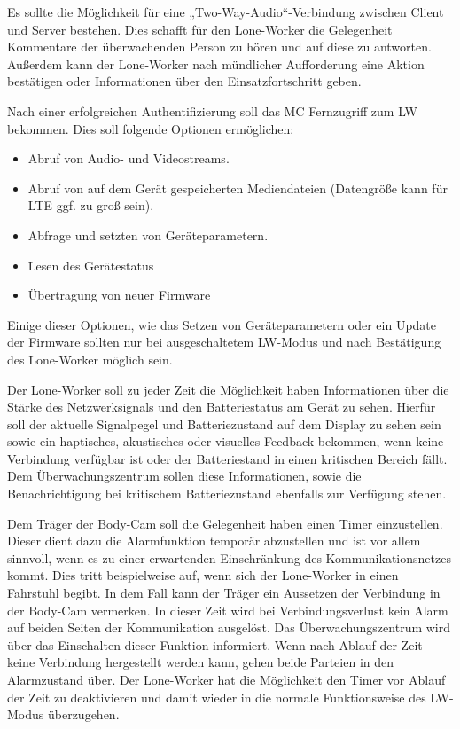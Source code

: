 \documentclass[thesis.tex]{subfiles}
\begin{document}
Es sollte die Möglichkeit für eine „Two-Way-Audio“-Verbindung zwischen Client und Server bestehen.
Dies schafft für den Lone-Worker die Gelegenheit Kommentare der überwachenden Person zu hören und auf diese zu antworten.
Außerdem kann der Lone-Worker nach mündlicher Aufforderung eine Aktion bestätigen oder Informationen über den Einsatzfortschritt geben.

Nach einer erfolgreichen Authentifizierung soll das MC Fernzugriff zum LW bekommen.
Dies soll folgende Optionen ermöglichen:
\begin{itemize}
    \item Abruf von Audio- und Videostreams.
    \item Abruf von auf dem Gerät gespeicherten Mediendateien (Datengröße kann für LTE ggf. zu groß sein).
    \item Abfrage und setzten von Geräteparametern.
    \item Lesen des Gerätestatus
    \item Übertragung von neuer Firmware
\end{itemize}

Einige dieser Optionen, wie das Setzen von Geräteparametern oder ein Update der Firmware sollten nur bei ausgeschaltetem LW-Modus und nach Bestätigung des Lone-Worker möglich sein.

Der Lone-Worker soll zu jeder Zeit die Möglichkeit haben Informationen über die Stärke des Netzwerksignals und den Batteriestatus am Gerät zu sehen. %
Hierfür soll der aktuelle Signalpegel und Batteriezustand auf dem Display zu sehen sein sowie ein haptisches, akustisches oder visuelles Feedback bekommen, wenn keine Verbindung verfügbar ist oder der Batteriestand in einen kritischen Bereich fällt.
Dem Überwachungszentrum sollen diese Informationen, sowie die Benachrichtigung bei kritischem Batteriezustand ebenfalls zur Verfügung stehen.

Dem Träger der Body-Cam soll die Gelegenheit haben einen \glqq Timer\grqq{} einzustellen.
Dieser dient dazu die Alarmfunktion temporär abzustellen und ist vor allem sinnvoll, wenn es zu einer erwartenden Einschränkung des Kommunikationsnetzes kommt.
Dies tritt beispielweise auf, wenn sich der Lone-Worker in einen Fahrstuhl begibt.
In dem Fall kann der Träger ein Aussetzen der Verbindung in der Body-Cam vermerken.
In dieser Zeit wird bei Verbindungsverlust kein Alarm auf beiden Seiten der Kommunikation ausgelöst.
Das Überwachungszentrum wird über das Einschalten dieser Funktion informiert.
Wenn nach Ablauf der Zeit keine Verbindung hergestellt werden kann, gehen beide Parteien in den Alarmzustand über.
Der Lone-Worker hat die Möglichkeit den Timer vor Ablauf der Zeit zu deaktivieren und damit wieder in die normale Funktionsweise des LW-Modus überzugehen.
\end{document}
